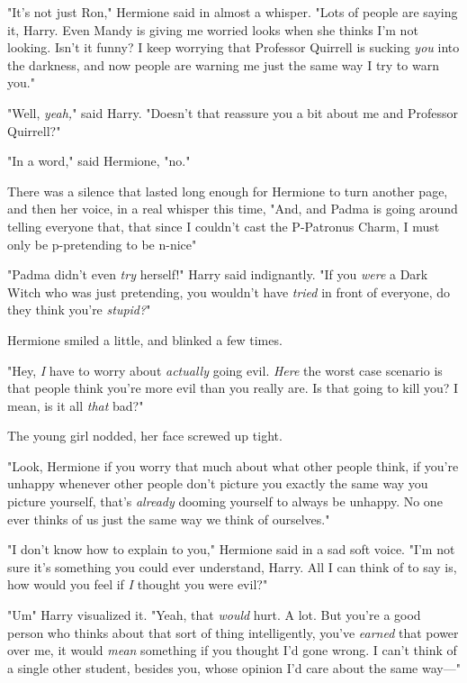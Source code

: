 "It's not just Ron," Hermione said in almost a whisper. "Lots of people are
saying it, Harry. Even Mandy is giving me worried looks when she thinks I'm not
looking. Isn't it funny? I keep worrying that Professor Quirrell is sucking
\emph{you} into the darkness, and now people are warning me just the same way I
try to warn you."

"Well, \emph{yeah,}" said Harry. "Doesn't that reassure you a bit about me and
Professor Quirrell?"

"In a word," said Hermione, "no."

There was a silence that lasted long enough for Hermione to turn another page,
and then her voice, in a real whisper this time, "And, and Padma is going
around telling everyone that, that since I couldn't cast the P-Patronus Charm,
I must only be p-pretending to be n-nice{\el}"

"Padma didn't even \emph{try} herself!" Harry said indignantly. "If you
\emph{were} a Dark Witch who was just pretending, you wouldn't have
\emph{tried} in front of everyone, do they think you're \emph{stupid?}"

Hermione smiled a little, and blinked a few times.

"Hey, \emph{I} have to worry about \emph{actually} going evil. \emph{Here} the
worst case scenario is that people think you're more evil than you really are.
Is that going to kill you? I mean, is it all \emph{that} bad?"

The young girl nodded, her face screwed up tight.

"Look, Hermione{\el} if you worry that much about what other people think,
if you're unhappy whenever other people don't picture you exactly the same way
you picture yourself, that's \emph{already} dooming yourself to always be
unhappy. No one ever thinks of us just the same way we think of ourselves."

"I don't know how to explain to you," Hermione said in a sad soft voice. "I'm
not sure it's something you could ever understand, Harry. All I can think of to
say is, how would you feel if \emph{I} thought you were evil?"

"Um{\el}" Harry visualized it. "Yeah, that \emph{would} hurt. A lot. But
you're a good person who thinks about that sort of thing intelligently, you've
\emph{earned} that power over me, it would \emph{mean} something if you thought
I'd gone wrong. I can't think of a single other student, besides you, whose
opinion I'd care about the same way\mbox{---}"

